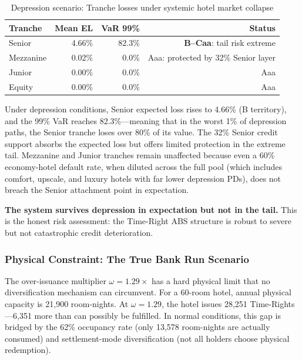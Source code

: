 \documentclass[12pt,a4paper]{article}
\begin{document}
\begin{table}[H]
\centering
\caption{Depression scenario: Tranche losses under systemic hotel market collapse}
\label{tab:depression}
\begin{tabular}{@{}lrrr@{}}
\toprule
\textbf{Tranche} & \textbf{Mean EL} & \textbf{VaR 99\%} & \textbf{Status} \\
\midrule
Senior      & 4.66\% & 82.3\% & \textbf{B--Caa}: tail risk extreme \\
Mezzanine   & 0.02\% & 0.0\%  & Aaa: protected by 32\% Senior layer \\
Junior      & 0.00\% & 0.0\%  & Aaa \\
Equity      & 0.00\% & 0.0\%  & Aaa \\
\bottomrule
\end{tabular}
\end{table}

Under depression conditions, Senior expected loss rises to 4.66\% (B territory), and the 99\% VaR reaches 82.3\%---meaning that in the worst 1\% of depression paths, the Senior tranche loses over 80\% of its value.
The 32\% Senior credit support absorbs the expected loss but offers limited protection in the extreme tail.
Mezzanine and Junior tranches remain unaffected because even a 60\% economy-hotel default rate, when diluted across the full pool (which includes comfort, upscale, and luxury hotels with far lower depression PDs), does not breach the Senior attachment point in expectation.

\textbf{The system survives depression in expectation but not in the tail.}
This is the honest risk assessment: the Time-Right ABS structure is robust to severe but not catastrophic credit deterioration.

\subsubsection{Physical Constraint: The True Bank Run Scenario}

The over-issuance multiplier $\omega = 1.29\times$ has a hard physical limit that no diversification mechanism can circumvent.
For a 60-room hotel, annual physical capacity is 21,900 room-nights.
At $\omega = 1.29$, the hotel issues 28,251 Time-Rights---6,351 more than can possibly be fulfilled.
In normal conditions, this gap is bridged by the 62\% occupancy rate (only 13,578 room-nights are actually consumed) and settlement-mode diversification (not all holders choose physical redemption).
\end{document}
